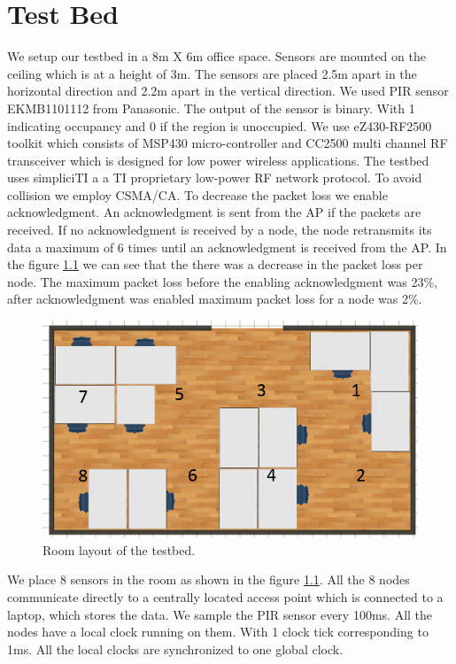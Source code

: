 \chapter{Test Bed}

We setup our testbed in a 8m X 6m office space. Sensors are mounted on the ceiling which is at a height of 3m. The sensors are  placed 2.5m apart in the horizontal direction and 2.2m apart in the vertical direction.  We used  PIR sensor EKMB1101112 from Panasonic. 
The output of the sensor is binary. With 1 indicating occupancy and 0 if the region is unoccupied.  We use eZ430-RF2500 toolkit which consists of MSP430 micro-controller  and CC2500 multi channel
RF transceiver which is designed for low power wireless applications. The testbed uses simpliciTI a  a TI proprietary  low-power RF network protocol. To avoid collision we employ CSMA/CA. To decrease
the packet loss we enable acknowledgment. An acknowledgment is sent from the AP if the packets are received. If no acknowledgment is received by a node, the node retransmits its data a maximum of 
6 times until an acknowledgment is  received from the AP. In the figure \ref{fig:roomLayout} we can see that the there was a decrease in the packet loss per node. The maximum packet loss before the enabling acknowledgment was 23\%, 
after acknowledgment was enabled maximum packet loss for a node was 2\%.
\begin{figure}
\centering
\includegraphics[scale=0.5]{./pics/roomLayout.png}
\caption{Room layout of the testbed.}
\label{fig:roomLayout}
\end{figure}

We place 8 sensors in the room as shown in the figure \ref{fig:roomLayout}. All the 8 nodes communicate directly to a centrally located access
point which is connected to a laptop, which stores the data. We sample the PIR sensor every 100ms.
All the nodes have a local clock running on them. With 1 clock tick corresponding to 1ms. All the local clocks are synchronized to one global clock.

